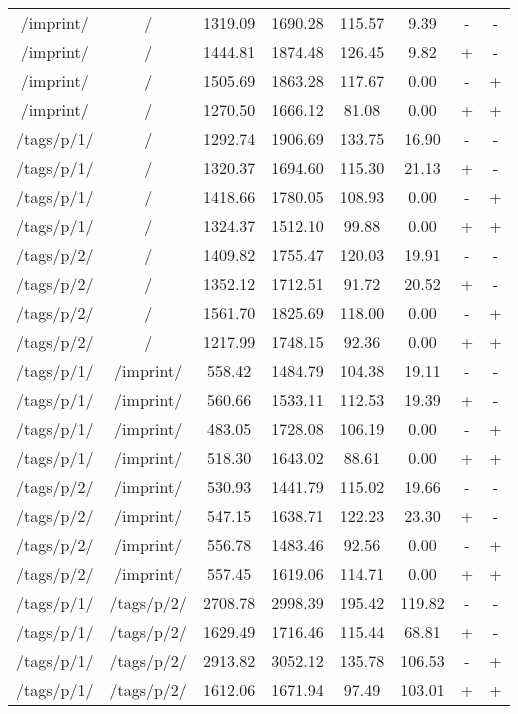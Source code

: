 \begin{appendix}
\begin{center}
\begin{longtable}{cccccccc}
\hline
/imprint/ & / & 1319.09 & 1690.28 & 115.57 & 9.39 & - & - \\
/imprint/ & / & 1444.81 & 1874.48 & 126.45 & 9.82 & + & - \\
/imprint/ & / & 1505.69 & 1863.28 & 117.67 & 0.00 & - & + \\
/imprint/ & / & 1270.50 & 1666.12 & 81.08 & 0.00 & + & + \\
\hline
\hline
/tags/p/1/ & / & 1292.74 & 1906.69 & 133.75 & 16.90 & - & - \\
/tags/p/1/ & / & 1320.37 & 1694.60 & 115.30 & 21.13 & + & - \\
/tags/p/1/ & / & 1418.66 & 1780.05 & 108.93 & 0.00 & - & + \\
/tags/p/1/ & / & 1324.37 & 1512.10 & 99.88 & 0.00 & + & + \\
\hline
/tags/p/2/ & / & 1409.82 & 1755.47 & 120.03 & 19.91 & - & - \\
/tags/p/2/ & / & 1352.12 & 1712.51 & 91.72 & 20.52 & + & - \\
/tags/p/2/ & / & 1561.70 & 1825.69 & 118.00 & 0.00 & - & + \\
/tags/p/2/ & / & 1217.99 & 1748.15 & 92.36 & 0.00 & + & + \\
\hline
/tags/p/1/ & /imprint/ & 558.42 & 1484.79 & 104.38 & 19.11 & - & - \\
/tags/p/1/ & /imprint/ & 560.66 & 1533.11 & 112.53 & 19.39 & + & - \\
/tags/p/1/ & /imprint/ & 483.05 & 1728.08 & 106.19 & 0.00 & - & + \\
/tags/p/1/ & /imprint/ & 518.30 & 1643.02 & 88.61 & 0.00 & + & + \\
\hline
/tags/p/2/ & /imprint/ & 530.93 & 1441.79 & 115.02 & 19.66 & - & - \\
/tags/p/2/ & /imprint/ & 547.15 & 1638.71 & 122.23 & 23.30 & + & - \\
/tags/p/2/ & /imprint/ & 556.78 & 1483.46 & 92.56 & 0.00 & - & + \\
/tags/p/2/ & /imprint/ & 557.45 & 1619.06 & 114.71 & 0.00 & + & + \\
\hline
\hline
/tags/p/1/ & /tags/p/2/ & 2708.78 & 2998.39 & 195.42 & 119.82 & - & - \\
/tags/p/1/ & /tags/p/2/ & 1629.49 & 1716.46 & 115.44 & 68.81 & + & - \\
/tags/p/1/ & /tags/p/2/ & 2913.82 & 3052.12 & 135.78 & 106.53 & - & + \\
/tags/p/1/ & /tags/p/2/ & 1612.06 & 1671.94 & 97.49 & 103.01 & + & + \\

\end{longtable}
\end{center}
\end{appendix}
